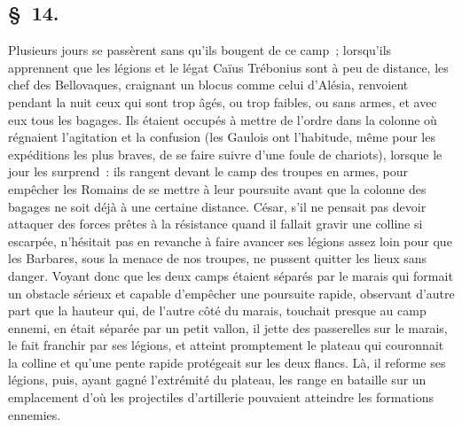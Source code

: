 \documentclass[french,twoside]{book} %
\begin{document}
\subsection[{§ 14.}]{ \textsc{§ 14.} }
\noindent Plusieurs jours se passèrent sans qu’ils bougent de ce camp ; lorsqu’ils apprennent que les légions et le légat Caïus Trébonius sont à peu de distance, les chef des Bellovaques, craignant un blocus comme celui d’Alésia, renvoient pendant la nuit ceux qui sont trop âgés, ou trop faibles, ou sans armes, et avec eux tous les bagages. Ils étaient occupés à mettre de l’ordre dans la colonne où régnaient l’agitation et la confusion (les Gaulois ont l’habitude, même pour les expéditions les plus braves, de se faire suivre d’une foule de chariots), lorsque le jour les surprend : ils rangent devant le camp des troupes en armes, pour empêcher les Romains de se mettre à leur poursuite avant que la colonne des bagages ne soit déjà à une certaine distance. César, s’il ne pensait pas devoir attaquer des forces prêtes à la résistance quand il fallait gravir une colline si escarpée, n’hésitait pas en revanche à faire avancer ses légions assez loin pour que les Barbares, sous la menace de nos troupes, ne pussent quitter les lieux sans danger. Voyant donc que les deux camps étaient séparés par le marais qui formait un obstacle sérieux et capable d’empêcher une poursuite rapide, observant d’autre part que la hauteur qui, de l’autre côté du marais, touchait presque au camp ennemi, en était séparée par un petit vallon, il jette des passerelles sur le marais, le fait franchir par ses légions, et atteint promptement le plateau qui couronnait la colline et qu’une pente rapide protégeait sur les deux flancs. Là, il reforme ses légions, puis, ayant gagné l’extrémité du plateau, les range en bataille sur un emplacement d’où les projectiles d’artillerie pouvaient atteindre les formations ennemies.
\end{document}

